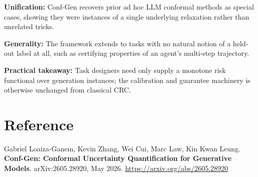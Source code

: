 \documentclass[10pt,twocolumn]{article}
\begin{document}
\textbf{Unification:} Conf-Gen recovers prior ad hoc LLM conformal
methods as special cases, showing they were instances of a single
underlying relaxation rather than unrelated tricks.

\textbf{Generality:} The framework extends to tasks with no natural
notion of a held-out label at all, such as certifying properties of an
agent's multi-step trajectory.

\textbf{Practical takeaway:} Task designers need only supply a monotone
risk functional over generation instances; the calibration and
guarantee machinery is otherwise unchanged from classical CRC.

\section*{Reference}

Gabriel Loaiza-Ganem, Kevin Zhang, Wei Cui, Marc Law, Kin Kwan Leung.
\textbf{Conf-Gen: Conformal Uncertainty Quantification for Generative
Models}.
arXiv:2605.28920, May 2026.
\url{https://arxiv.org/abs/2605.28920}
\end{document}

